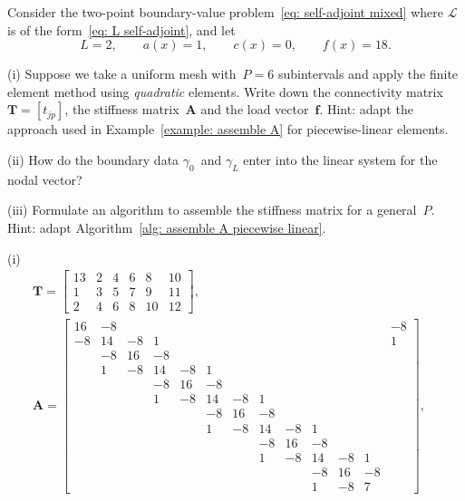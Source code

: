 \begin{Exercises}
\exercise\label{ex: assemble quadratic 1d}
Consider the two-point boundary-value problem~\eqref{eq: self-adjoint mixed} 
where $\mathcal{L}$ is of the form~\eqref{eq: L self-adjoint}, and let
\[
L=2,\qquad a(x)=1,\qquad c(x)=0,\qquad f(x)=18.
\]
\begin{description}
\item{(i)} Suppose we take a uniform mesh with~$P=6$ subintervals and apply the 
finite element method using \emph{quadratic} elements.  Write down the
connectivity matrix~$\boldsymbol{T}=[t_{jp}]$, the stiffness
matrix~$\boldsymbol{A}$ and the load vector~$\boldsymbol{f}$. Hint: adapt the
approach used in Example~\ref{example: assemble A} for piecewise-linear
elements.
\item{(ii)} How do the boundary data $\gamma_0$~and $\gamma_L$ enter into the 
linear system for the nodal vector?
\item{(iii)} Formulate an algorithm to assemble the stiffness matrix for a 
general~$P$.  Hint: adapt Algorithm~\ref{alg: assemble A piecewise linear}.
\end{description}
\begin{ans}
(i) 
\begin{gather*}
\boldsymbol{T}=\begin{bmatrix}
13& 2& 4& 6& 8&10\\
 1& 3& 5& 7& 9&11\\
 2& 4& 6& 8&10&12
\end{bmatrix},\\
\boldsymbol{A}=\left[\begin{array}{cccccccccccc|c}
16&-8&  &  &  &  &  &  &  &  &  &  &-8\\
-8&14&-8& 1&  &  &  &  &  &  &  &  & 1\\
  &-8&16&-8&  &  &  &  &  &  &  &  &  \\
  & 1&-8&14&-8& 1&  &  &  &  &  &  &  \\
  &  &  &-8&16&-8&  &  &  &  &  &  &\\
  &  &  & 1&-8&14&-8& 1&  &  &  &  &  \\
  &  &  &  &  &-8&16&-8&  &  &  &  &  \\
  &  &  &  &  & 1&-8&14&-8& 1&  &  &  \\
  &  &  &  &  &  &  &-8&16&-8&  &  &  \\
  &  &  &  &  &  &  & 1&-8&14&-8& 1&  \\
  &  &  &  &  &  &  &  &  &-8&16&-8&  \\
  &  &  &  &  &  &  &  &  & 1&-8& 7&
\end{array}\right],\quad

\end{gather*}
\end{ans}
\end{Exercises}
